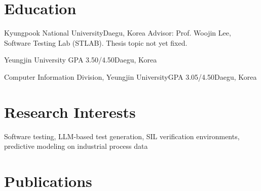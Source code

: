 \documentclass[small]{cv}
\begin{document}
\makecvheader

\section{Education}
  {Kyungpook National University}{Daegu, Korea}
  {Advisor: Prof. Woojin Lee, Software Testing Lab (STLAB). Thesis topic not yet fixed.}

  {Yeungjin University }
  {GPA 3.50/4.50\cvsep Daegu, Korea}{}

  {Computer Information Division, Yeungjin University}{GPA 3.05/4.50\cvsep Daegu, Korea}{}


\section{Research Interests}
Software testing, LLM-based test generation, SIL verification environments,
predictive modeling on industrial process data

\section{Publications }
\end{document}
